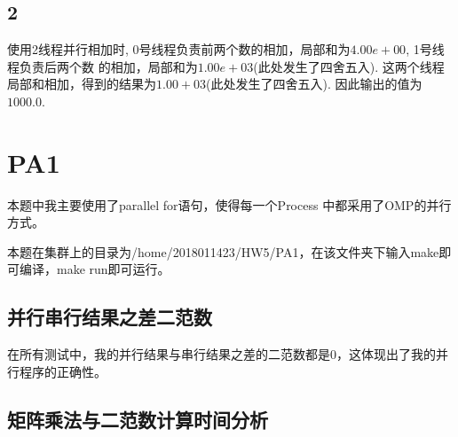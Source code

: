 \documentclass[UTF8]{article}
\begin{document}
\subsection{2}
使用2线程并行相加时,
0号线程负责前两个数的相加，局部和为$4.00e+00$, 1号线程负责后两个数
的相加，局部和为$1.00e+03$(此处发生了四舍五入). 
这两个线程局部和相加，得到的结果为$1.00+03$(此处发生了四舍五入).
因此输出的值为$1000.0$.
\clearpage

\section{PA1}
本题中我主要使用了parallel for语句，使得每一个Process
中都采用了OMP的并行方式。

本题在集群上的目录为/home/2018011423/HW5/PA1，在该文件夹下输入make即可编译，make run即可运行。

\subsection{并行串行结果之差二范数}
在所有测试中，我的并行结果与串行结果之差的二范数都是0，这体现出了我的并行程序的正确性。
\subsection{矩阵乘法与二范数计算时间分析}
\end{document}
